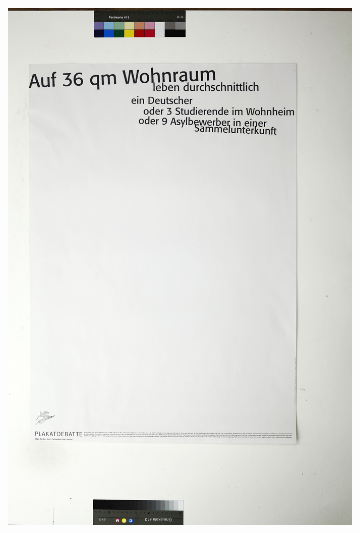 \documentclass[a4paper,12pt,ngerman]{article}
\begin{document}
\begin{figure}[ht]
\begin{subfigure}[b]{0.5\linewidth}
	\includegraphics[width=\linewidth]{Abbildung_8c_(acht1_081)}
	\end{subfigure}
	\begin{subfigure}[b]{0.5\linewidth}
	\centering

\end{subfigure}
\end{figure}
\end{document}
